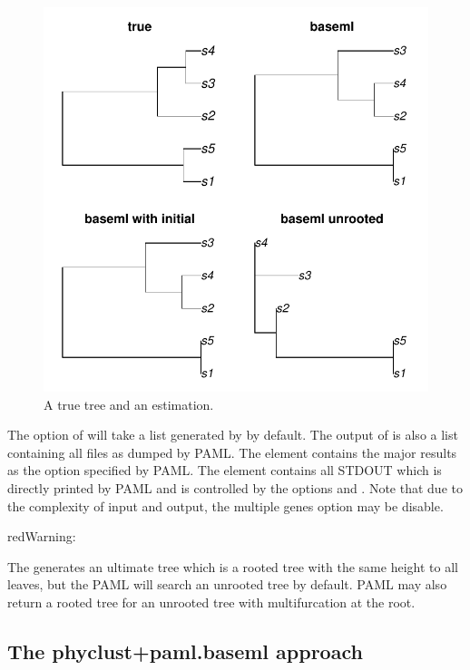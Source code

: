 \begin{figure}[h]
\begin{center}
\includegraphics[width=5.0in]{./phyclust-include/f-paml_baseml}
\caption{A true tree and an estimation.}
\label{fig:pamlbaseml}
\end{center}
\end{figure}


The option  of  will take a list
generated by  by default.
The output of  is also a list containing all files
as dumped by PAML. The element  contains the major results as
the option  specified by PAML. The element 
contains all STDOUT which is directly printed by PAML and is controlled by
the options  and .
Note that due to the complexity of input and output, the multiple genes option
may be disable.

\begin{color}{red}Warning:\end{color}
The  generates an ultimate tree which is a rooted tree with
the same height to all leaves, but the PAML will search an unrooted tree by
default. PAML may also return a rooted tree for an unrooted tree with
multifurcation at the root.




\subsection[The phyclust+paml.baseml approach]{The phyclust+paml.baseml approach}
\label{sec:phyclustpamlbaseml}

